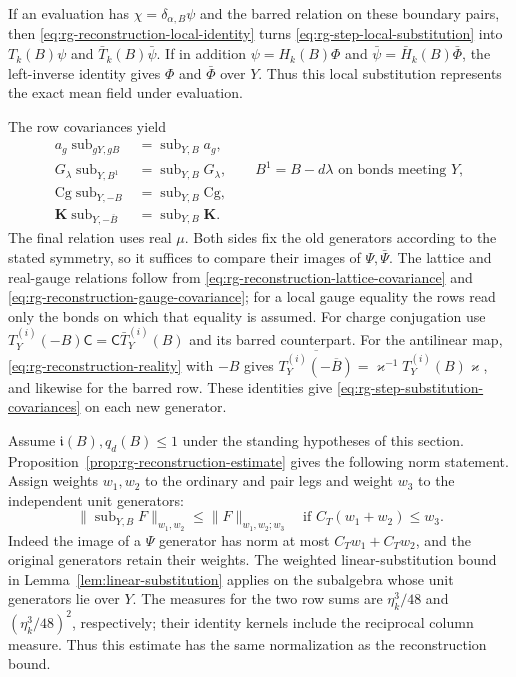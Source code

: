 If an evaluation has
$\chi=\delta_{\alpha,B}\psi$ and the barred
relation on these boundary pairs, then
\eqref{eq:rg-reconstruction-local-identity}
turns \eqref{eq:rg-step-local-substitution}
into $T_k(B)\psi$ and $\bar T_k(B)\bar\psi$.
If in addition $\psi=H_k(B)\Phi$ and
$\bar\psi=\bar H_k(B)\bar\Phi$, the left-inverse
identity gives $\Phi$ and $\bar\Phi$ over $Y$.
Thus this local substitution represents the exact
mean field under evaluation.

The row covariances yield
\begin{equation}\label{eq:rg-step-substitution-covariances}
 \begin{split}
 a_g\operatorname{sub}_{gY,gB}
                        &=\operatorname{sub}_{Y,B}a_g,\\
 G_\lambda\operatorname{sub}_{Y,B^1}
                        &=\operatorname{sub}_{Y,B}G_\lambda,
                 \qquad B^1=B-d\lambda\text{ on bonds meeting }Y,\\
 \mathrm{Cg}\operatorname{sub}_{Y,-B}
                        &=\operatorname{sub}_{Y,B}\mathrm{Cg},\\
 \mathbf K\operatorname{sub}_{Y,-\overline B}
                        &=\operatorname{sub}_{Y,B}\mathbf K.
 \end{split}
\end{equation}
The final relation uses real $\mu$.
Both sides fix the old generators according to the
stated symmetry, so it suffices to compare their
images of $\Psi,\bar\Psi$. The lattice and real-gauge
relations follow from
\eqref{eq:rg-reconstruction-lattice-covariance} and
\eqref{eq:rg-reconstruction-gauge-covariance}; for
a local gauge equality the rows read only the
bonds on which that equality is assumed.
For charge conjugation use
$T_Y^{(i)}(-B)\mathsf C=\mathsf C\bar T_Y^{(i)}(B)$
and its barred counterpart. For the antilinear map,
\eqref{eq:rg-reconstruction-reality} with $-B$ gives
$\overline{T_Y^{(i)}(-\overline B)}
=\varkappa^{-1}T_Y^{(i)}(B)\varkappa$, and likewise
for the barred row. These identities give
\eqref{eq:rg-step-substitution-covariances} on
each new generator.

Assume $\mathfrak i(B),q_d(B)\le1$ under the standing hypotheses
of this section. Proposition~\ref{prop:rg-reconstruction-estimate}
gives the following norm statement. Assign weights
$w_1,w_2$ to the ordinary and pair legs and weight $w_3$
to the independent unit generators:
\begin{equation}\label{eq:rg-step-substitution-bound}
 \|\operatorname{sub}_{Y,B}F\|_{w_1,w_2}
                         \le\|F\|_{w_1,w_2;w_3}
             \quad\text{if }C_T(w_1+w_2)\le w_3.
\end{equation}
Indeed the image of a $\Psi$ generator has norm
at most $C_Tw_1+C_Tw_2$, and the original generators
retain their weights. The weighted linear-substitution
bound in Lemma~\ref{lem:linear-substitution}
applies on the subalgebra whose unit generators lie
over $Y$. The measures for the two row sums are
$\eta_k^3/48$ and $(\eta_k^3/48)^2$, respectively;
their identity kernels include the reciprocal
column measure. Thus this estimate has the same
normalization as the reconstruction bound.
